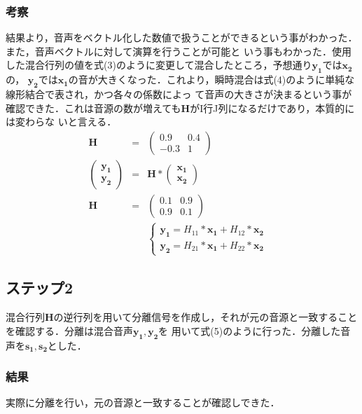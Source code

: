 \documentclass[a4j]{jarticle}
\begin{document}
\subsubsection*{考察}
結果より，音声をベクトル化した数値で扱うことができるという事がわかった．また，音声ベクトルに対して演算を行うことが可能と
いう事もわかった．使用した混合行列の値を式(3)のように変更して混合したところ，予想通り$\bm{y_1}$では$\bm{x_2}$の，
$\bm{y_2}$では$\bm{x_1}$の音が大きくなった．これより，瞬時混合は式(4)のように単純な線形結合で表され，かつ各々の係数によっ
て音声の大きさが決まるという事が確認できた．これは音源の数が増えても$\bm{H}$がI行J列になるだけであり，本質的には変わらな
いと言える．
\begin{eqnarray}
\bm{H} &=& \left(
 \begin{array}{cc}
  0.9 & 0.4\\
  -0.3 & 1
 \end{array}
\right) \\
\left(
\begin{array}{c}
 \bm{y_1}\\
\bm{y_2}
\end{array}
\right)
&=& \bm{H} * 
\left(
\begin{array}{c}
 \bm{x_1}\\
 \bm{x_2}
\end{array}
\right)\\
\bm{H} &=& \left(
 \begin{array}{cc}
  0.1 & 0.9\\
  0.9 & 0.1
 \end{array}
\right) \\
&&
\begin{cases}
 \bm{y_1} = H_{11} * \bm{x_1} +  H_{12} * \bm{x_2} &  \\
 \bm{y_2} = H_{21} * \bm{x_1} +  H_{22} * \bm{x_2} &
\end{cases}
\end{eqnarray}

\subsection*{ステップ2}
混合行列$\bm{H}$の逆行列を用いて分離信号を作成し，それが元の音源と一致することを確認する．分離は混合音声$\bm{y_1}, \bm{y_2}$を
用いて式(5)のように行った．分離した音声を$\bm{s_1}, \bm{s_2}$とした．
\subsubsection*{結果}
実際に分離を行い，元の音源と一致することが確認しできた．
\end{document}
